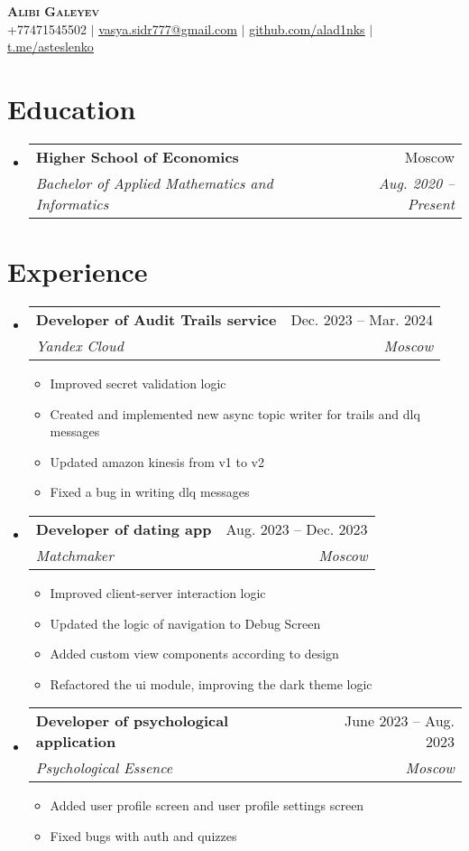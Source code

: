 \documentclass[letterpaper,11pt]{article}
\makeatletter
\newcommand{\resumeItem}[1]{
  \item\small{
    {#1 \vspace{-2pt}}
  }
}
\newcommand{\resumeSubheading}[4]{
  \vspace{-2pt}\item
    \begin{tabular*}{0.97\textwidth}[t]{l@{\extracolsep{\fill}}r}
      \textbf{#1} & #2 \\
      \textit{\small#3} & \textit{\small #4} \\
    \end{tabular*}\vspace{-7pt}
}
\newcommand{\resumeSubHeadingListStart}{\begin{itemize}[leftmargin=0.15in, label={}]}
\newcommand{\resumeSubHeadingListEnd}{\end{itemize}}
\newcommand{\resumeItemListStart}{\begin{itemize}}
\newcommand{\resumeItemListEnd}{\end{itemize}\vspace{-5pt}}
\makeatother
\begin{document}
\begin{center}
    \textbf{\Huge \scshape Alibi Galeyev} \\ \vspace{1pt}
    \small +77471545502 $|$
    \href{mailto:vasya.sidr777@gmail.com}{\underline{vasya.sidr777@gmail.com}} $|$ 
    \href{https://github.com/alad1nks}{\underline{github.com/alad1nks}} $|$
    \href{https://t.me/asteslenko}{\underline{t.me/asteslenko}}
\end{center}


\section{Education}
  \resumeSubHeadingListStart
    \resumeSubheading
      {Higher School of Economics}{Moscow}
      {Bachelor of Applied Mathematics and Informatics}{Aug. 2020 -- Present}
  \resumeSubHeadingListEnd


\section{Experience}
  \resumeSubHeadingListStart

    \resumeSubheading
      {Developer of Audit Trails service}{Dec. 2023 -- Mar. 2024}
      {Yandex Cloud}{Moscow}
      \resumeItemListStart
        \resumeItem{Improved secret validation logic}
        \resumeItem{Created and implemented new async topic writer for trails and dlq messages}
        \resumeItem{Updated amazon kinesis from v1 to v2}
        \resumeItem{Fixed a bug in writing dlq messages}
      \resumeItemListEnd

    \resumeSubheading
      {Developer of dating app}{Aug. 2023 -- Dec. 2023}
      {Matchmaker}{Moscow}
      \resumeItemListStart
        \resumeItem{Improved client-server interaction logic}
        \resumeItem{Updated the logic of navigation to Debug Screen}
        \resumeItem{Added custom view components according to design}
        \resumeItem{Refactored the ui module, improving the dark theme logic}
      \resumeItemListEnd

    \resumeSubheading
      {Developer of psychological application}{June 2023 -- Aug. 2023}
      {Psychological Essence}{Moscow}
      \resumeItemListStart
        \resumeItem{Added user profile screen and user profile settings screen}
        \resumeItem{Fixed bugs with auth and quizzes}
      \resumeItemListEnd

  \resumeSubHeadingListEnd
\end{document}
